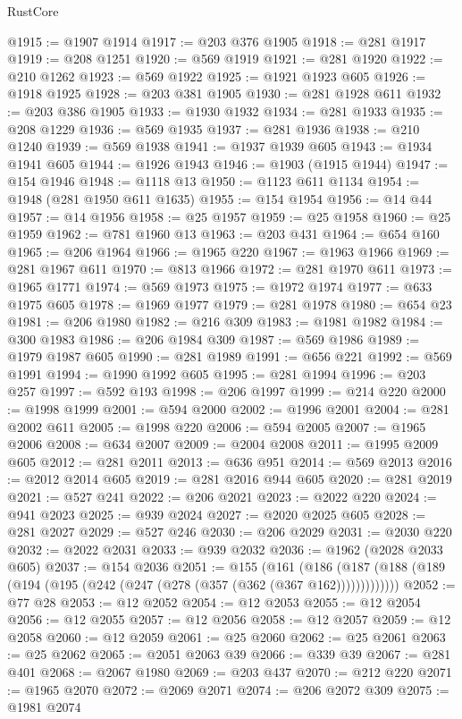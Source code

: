 \begin{lexlean}{RustCore}
\begin{coremodule}
@1915 := @1907 @1914
@1917 := @203 @376 @1905
@1918 := @281 @1917
@1919 := @208 @1251
@1920 := @569 @1919
@1921 := @281 @1920
@1922 := @210 @1262
@1923 := @569 @1922
@1925 := @1921 @1923 @605
@1926 := @1918 @1925
@1928 := @203 @381 @1905
@1930 := @281 @1928 @611
@1932 := @203 @386 @1905
@1933 := @1930 @1932
@1934 := @281 @1933
@1935 := @208 @1229
@1936 := @569 @1935
@1937 := @281 @1936
@1938 := @210 @1240
@1939 := @569 @1938
@1941 := @1937 @1939 @605
@1943 := @1934 @1941 @605
@1944 := @1926 @1943
@1946 := @1903 (@1915 @1944)
@1947 := @154 @1946
@1948 := @1118 @13
@1950 := @1123 @611 @1134
@1954 := @1948 (@281 @1950 @611 @1635)
@1955 := @154 @1954
@1956 := @14 @44
@1957 := @14 @1956
@1958 := @25 @1957
@1959 := @25 @1958
@1960 := @25 @1959
@1962 := @781 @1960 @13
@1963 := @203 @431
@1964 := @654 @160
@1965 := @206 @1964
@1966 := @1965 @220
@1967 := @1963 @1966
@1969 := @281 @1967 @611
@1970 := @813 @1966
@1972 := @281 @1970 @611
@1973 := @1965 @1771
@1974 := @569 @1973
@1975 := @1972 @1974
@1977 := @633 @1975 @605
@1978 := @1969 @1977
@1979 := @281 @1978
@1980 := @654 @23
@1981 := @206 @1980
@1982 := @216 @309
@1983 := @1981 @1982
@1984 := @300 @1983
@1986 := @206 @1984 @309
@1987 := @569 @1986
@1989 := @1979 @1987 @605
@1990 := @281 @1989
@1991 := @656 @221
@1992 := @569 @1991
@1994 := @1990 @1992 @605
@1995 := @281 @1994
@1996 := @203 @257
@1997 := @592 @193
@1998 := @206 @1997
@1999 := @214 @220
@2000 := @1998 @1999
@2001 := @594 @2000
@2002 := @1996 @2001
@2004 := @281 @2002 @611
@2005 := @1998 @220
@2006 := @594 @2005
@2007 := @1965 @2006
@2008 := @634 @2007
@2009 := @2004 @2008
@2011 := @1995 @2009 @605
@2012 := @281 @2011
@2013 := @636 @951
@2014 := @569 @2013
@2016 := @2012 @2014 @605
@2019 := @281 @2016 @944 @605
@2020 := @281 @2019
@2021 := @527 @241
@2022 := @206 @2021
@2023 := @2022 @220
@2024 := @941 @2023
@2025 := @939 @2024
@2027 := @2020 @2025 @605
@2028 := @281 @2027
@2029 := @527 @246
@2030 := @206 @2029
@2031 := @2030 @220
@2032 := @2022 @2031
@2033 := @939 @2032
@2036 := @1962 (@2028 @2033 @605)
@2037 := @154 @2036
@2051 := @155
    (@161 (@186 (@187 (@188 (@189 (@194 (@195 (@242 (@247 (@278 (@357 (@362 (@367 @162)))))))))))))
@2052 := @77 @28
@2053 := @12 @2052
@2054 := @12 @2053
@2055 := @12 @2054
@2056 := @12 @2055
@2057 := @12 @2056
@2058 := @12 @2057
@2059 := @12 @2058
@2060 := @12 @2059
@2061 := @25 @2060
@2062 := @25 @2061
@2063 := @25 @2062
@2065 := @2051 @2063 @39
@2066 := @339 @39
@2067 := @281 @401
@2068 := @2067 @1980
@2069 := @203 @437
@2070 := @212 @220
@2071 := @1965 @2070
@2072 := @2069 @2071
@2074 := @206 @2072 @309
@2075 := @1981 @2074

\end{coremodule}
\end{lexlean}
